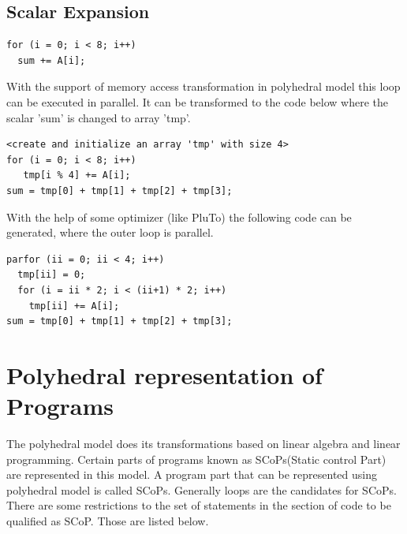 \subsection{Scalar Expansion}
{\footnotesize
\begin{lstlisting}
for (i = 0; i < 8; i++)
  sum += A[i];
\end{lstlisting}
}
With the support of memory access transformation in polyhedral model this loop
can be executed in parallel. It can be transformed to the code below where the scalar 'sum'
is changed to array 'tmp'.  
{\footnotesize
\begin{lstlisting}
<create and initialize an array 'tmp' with size 4>
for (i = 0; i < 8; i++)
   tmp[i % 4] += A[i];
sum = tmp[0] + tmp[1] + tmp[2] + tmp[3];
\end{lstlisting}
}
With the help of some optimizer (like PluTo\cite{pluto}) the following code
can be generated, where the outer loop is parallel.
{\footnotesize
\begin{lstlisting}
parfor (ii = 0; ii < 4; i++)
  tmp[ii] = 0;
  for (i = ii * 2; i < (ii+1) * 2; i++)
    tmp[ii] += A[i];
sum = tmp[0] + tmp[1] + tmp[2] + tmp[3];
\end{lstlisting}
}

\section{Polyhedral representation of Programs}

The polyhedral model does its transformations based on linear algebra and linear programming.
Certain parts of programs known as SCoPs(Static control Part) are represented in this model.
A program part that can be represented using polyhedral model is called SCoPs. Generally
loops are the candidates for SCoPs. There are some restrictions to the set of statements 
in the section of code to be qualified as SCoP. Those are listed below.

